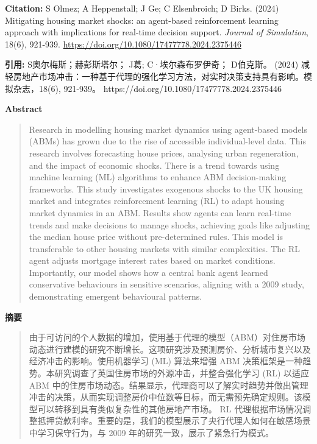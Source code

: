 \noindent\textbf{Citation:} S Olmez; A Heppenstall; J Ge; C Elsenbroich; D Birks. (2024) Mitigating housing market shocks: an agent-based reinforcement learning approach with implications for real-time decision support. \textit{Journal of Simulation}, 18(6), 921-939. \url{https://doi.org/10.1080/17477778.2024.2375446}

\vspace{0.5em}
\noindent\textbf{引用:} S奥尔梅斯；赫彭斯塔尔； J葛; C·埃尔森布罗伊奇； D伯克斯。 (2024) 减轻房地产市场冲击：一种基于代理的强化学习方法，对实时决策支持具有影响。模拟杂志，18(6), 921-939。 https://doi.org/10.1080/17477778.2024.2375446

\vspace{1.5em}
\noindent\textbf{Abstract}\par
\begin{quote}\small
Research in modelling housing market dynamics using agent-based models (ABMs) has grown due to the rise of accessible individual-level data. This research involves forecasting house prices, analysing urban regeneration, and the impact of economic shocks. There is a trend towards using machine learning (ML) algorithms to enhance ABM decision-making frameworks. This study investigates exogenous shocks to the UK housing market and integrates reinforcement learning (RL) to adapt housing market dynamics in an ABM. Results show agents can learn real-time trends and make decisions to manage shocks, achieving goals like adjusting the median house price without pre-determined rules. This model is transferable to other housing markets with similar complexities. The RL agent adjusts mortgage interest rates based on market conditions. Importantly, our model shows how a central bank agent learned conservative behaviours in sensitive scenarios, aligning with a 2009 study, demonstrating emergent behavioural patterns.
\end{quote}

\noindent\textbf{摘要}\par
\begin{quote}\small
由于可访问的个人数据的增加，使用基于代理的模型（ABM）对住房市场动态进行建模的研究不断增长。这项研究涉及预测房价、分析城市复兴以及经济冲击的影响。使用机器学习 (ML) 算法来增强 ABM 决策框架是一种趋势。本研究调查了英国住房市场的外源冲击，并整合强化学习 (RL) 以适应 ABM 中的住房市场动态。结果显示，代理商可以了解实时趋势并做出管理冲击的决策，从而实现调整房价中位数等目标，而无需预先确定规则。该模型可以转移到具有类似复杂性的其他房地产市场。 RL 代理根据市场情况调整抵押贷款利率。重要的是，我们的模型展示了央行代理人如何在敏感场景中学习保守行为，与 2009 年的研究一致，展示了紧急行为模式。
\end{quote}

